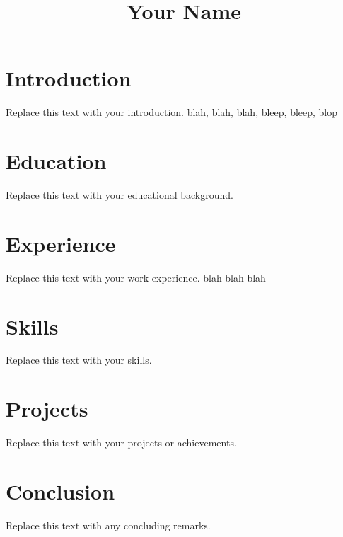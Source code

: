 \documentclass{article}
\begin{document}
\title{Your Name}
\author{}
\date{}

\maketitle

\section{Introduction}
Replace this text with your introduction. blah, blah, blah, bleep, bleep, blop

\section{Education}
Replace this text with your educational background.

\section{Experience}
Replace this text with your work experience. blah blah blah

\section{Skills}
Replace this text with your skills.

\section{Projects}
Replace this text with your projects or achievements.

\section{Conclusion}
Replace this text with any concluding remarks.
\end{document}
